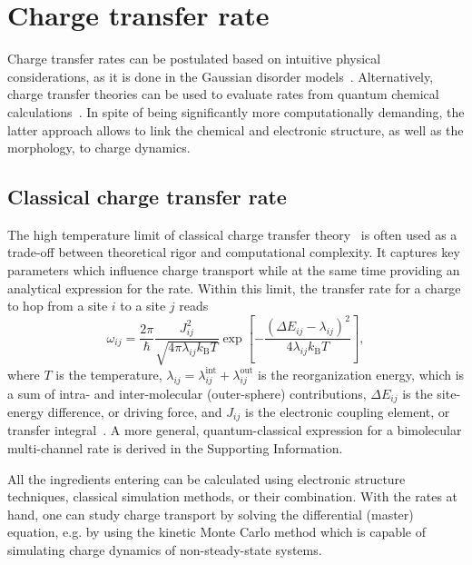 \section{Charge transfer rate}

Charge transfer rates can be postulated based on intuitive physical considerations, as it is done in the Gaussian disorder models~\cite{walker_electrical_2002,baessler_charge_1993,borsenberger_charge_1991,pasveer_unified_2005}. Alternatively, charge transfer theories can be used to evaluate rates from quantum chemical calculations~\cite{bredas_molecular_2009,coropceanu_charge_2007,bredas_charge-transfer_2004,nelson_modeling_2009,baumeier_density-functional_2010,kirkpatrick_approximate_2008}. In spite of being significantly more computationally demanding, the latter approach allows to link the chemical and electronic structure, as well as the morphology, to charge dynamics.

\subsection{Classical charge transfer rate}
The high temperature limit of classical charge transfer  theory~\cite{marcus_electron_1993,hutchison_hopping_2005} is often used as a trade-off between theoretical rigor and computational complexity. It captures key parameters which influence charge transport while at the same time providing an analytical expression for the rate. Within this limit, the transfer rate for a charge to hop from a site $i$ to a site $j$ reads
%
\begin{equation}
\omega_{ij}  = \frac{2 \pi}{\hbar}  \frac{ J_{ij}^2 }{\sqrt{ 4 \pi \lambda_{ij} k_\text{B}T}} \exp \left[
-\frac{\left(\Delta E_{ij}-\lambda_{ij}\right)^2}{4 \lambda_{ij}
k_\text{B} T} \right],
\label{equ:marcus}
\end{equation}
%
where $T$ is the temperature, $\lambda_{ij} = \lambda_{ij}^\text{int} + \lambda_{ij}^\text{out}$ is the reorganization energy, which is a sum of intra- and inter-molecular (outer-sphere) contributions, $\Delta E_{ij}$ is the site-energy difference, or driving force, and $J_{ij}$ is the electronic coupling element, or transfer integral~\cite{note_marcus}. A more general, quantum-classical expression for a bimolecular multi-channel rate is derived in the Supporting Information.

All the ingredients entering  can be calculated using electronic structure techniques, classical simulation methods, or their combination. With the rates at hand, one can study charge transport by solving the differential (master) equation, e.g. by using the kinetic Monte Carlo method which is capable of simulating charge dynamics of non-steady-state systems.


